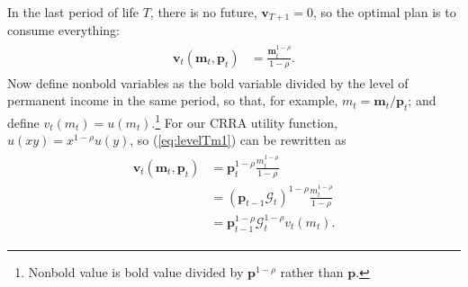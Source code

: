 \documentclass[titlepage, headings=optiontotocandhead]{Resources/texmf-local/tex/latex/econtex}
\begin{document}
In the last {period} of life $T$, there is no future, $\mathbf{v}_{T+1} = 0$, so the optimal plan is to consume everything:
\begin{equation}\begin{gathered}\begin{aligned}
      \mathbf{v}_{t}(\mathbf{m}_{t},\mathbf{p}_{t})  & = \frac{\mathbf{m}_{t}^{1-\rho}}{1-\rho}. \label{eq:levelTm1}
    \end{aligned}\end{gathered}\end{equation}
Now define nonbold variables as the bold variable divided by the level of permanent income in the same period, so that, for example, $m_{t}=\mathbf{m}_{t}/\mathbf{p}_{t}$; and define $v_{t}(m_{t}) = u(m_{t})$.\footnote{Nonbold value is bold value divided by $\mathbf{p}^{1-\rho}$ rather than $\mathbf{p}$.}  For our CRRA utility function, $u(xy)=x^{1-\rho}u(y)$, so (\ref{eq:levelTm1}) can be rewritten as
\begin{equation}\begin{gathered}\begin{aligned}
      \mathbf{v}_{t}(\mathbf{m}_{t},\mathbf{p}_{t}) & = \mathbf{p}_{t}^{1-\rho}\frac{{m}_{t}^{1-\rho}}{1-\rho}                       \\
                                                & = (\mathbf{p}_{t-1}\mathcal{G}_{t})^{1-\rho}\frac{{m}_{t}^{1-\rho}}{1-\rho} \\
                                                &= \mathbf{p}_{t-1}^{1-\rho}\mathcal{G}_{t}^{1-\rho}v_{t}(m_{t}). \label{eq:vT}
    \end{aligned}\end{gathered}\end{equation}
\end{document}
